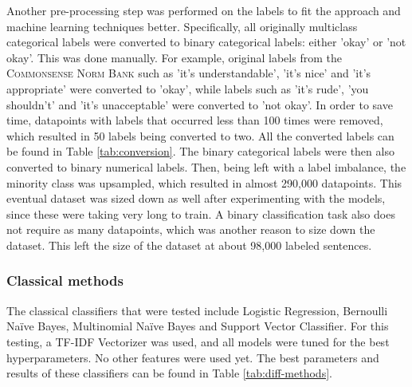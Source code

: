 \documentclass[final]{clv3} %
\begin{document}
Another pre-processing step was performed on the labels to fit the approach and machine learning techniques better. Specifically, all originally multiclass categorical labels were converted to binary categorical labels: either 'okay' or 'not okay'. This was done manually. For example, original labels from the \textsc{Commonsense Norm Bank} such as 'it’s understandable', 'it’s nice' and 'it’s appropriate' were converted to 'okay', while labels such as 'it’s rude', 'you shouldn’t' and 'it’s unacceptable' were converted to 'not okay'. In order to save time, datapoints with labels that occurred less than 100 times were removed, which resulted in 50 labels being converted to two. All the converted labels can be found in Table \ref{tab:conversion}. The binary categorical labels were then also converted to binary numerical labels. Then, being left with a label imbalance, the minority class was upsampled, which resulted in almost 290,000 datapoints. This eventual dataset was sized down as well after experimenting with the models, since these were taking very long to train. A binary classification task also does not require as many datapoints, which was another reason to size down the dataset. This left the size of the dataset at about 98,000 labeled sentences.


\subsubsection{Classical methods}

The classical classifiers that were tested include Logistic Regression, Bernoulli Naïve Bayes, Multinomial Naïve Bayes and Support Vector Classifier. For this testing, a TF-IDF Vectorizer was used, and all models were tuned for the best hyperparameters. No other features were used yet. The best parameters and results of these classifiers can be found in Table \ref{tab:diff-methods}.
\end{document}
